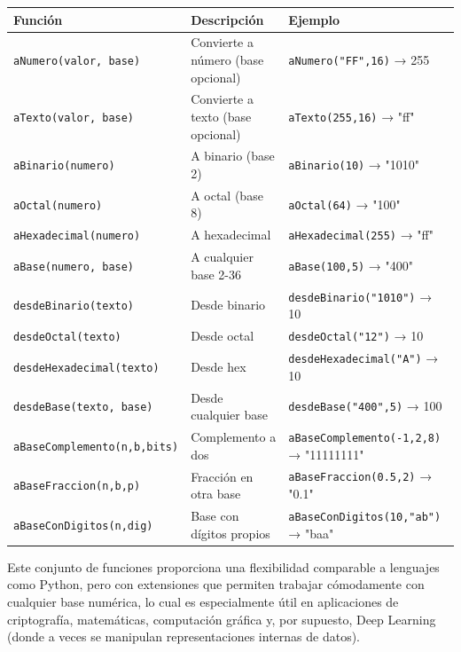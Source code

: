 \documentclass[12pt]{article}
\begin{document}
\begin{center}
\begin{tabular}{|l|l|p{6cm}|}
\hline
\textbf{Función} & \textbf{Descripción} & \textbf{Ejemplo} \\
\hline
\texttt{aNumero(valor, base)} & Convierte a número (base opcional) & \texttt{aNumero("FF",16)} → 255 \\
\texttt{aTexto(valor, base)} & Convierte a texto (base opcional) & \texttt{aTexto(255,16)} → "ff" \\
\texttt{aBinario(numero)} & A binario (base 2) & \texttt{aBinario(10)} → "1010" \\
\texttt{aOctal(numero)} & A octal (base 8) & \texttt{aOctal(64)} → "100" \\
\texttt{aHexadecimal(numero)} & A hexadecimal & \texttt{aHexadecimal(255)} → "ff" \\
\texttt{aBase(numero, base)} & A cualquier base 2-36 & \texttt{aBase(100,5)} → "400" \\
\texttt{desdeBinario(texto)} & Desde binario & \texttt{desdeBinario("1010")} → 10 \\
\texttt{desdeOctal(texto)} & Desde octal & \texttt{desdeOctal("12")} → 10 \\
\texttt{desdeHexadecimal(texto)} & Desde hex & \texttt{desdeHexadecimal("A")} → 10 \\
\texttt{desdeBase(texto, base)} & Desde cualquier base & \texttt{desdeBase("400",5)} → 100 \\
\texttt{aBaseComplemento(n,b,bits)} & Complemento a dos & \texttt{aBaseComplemento(-1,2,8)} → "11111111" \\
\texttt{aBaseFraccion(n,b,p)} & Fracción en otra base & \texttt{aBaseFraccion(0.5,2)} → "0.1" \\
\texttt{aBaseConDigitos(n,dig)} & Base con dígitos propios & \texttt{aBaseConDigitos(10,"ab")} → "baa" \\
\hline
\end{tabular}
\end{center}

Este conjunto de funciones proporciona una flexibilidad comparable a lenguajes como Python, pero con extensiones que permiten trabajar cómodamente con cualquier base numérica, lo cual es especialmente útil en aplicaciones de criptografía, matemáticas, computación gráfica y, por supuesto, Deep Learning (donde a veces se manipulan representaciones internas de datos).
\end{document}
